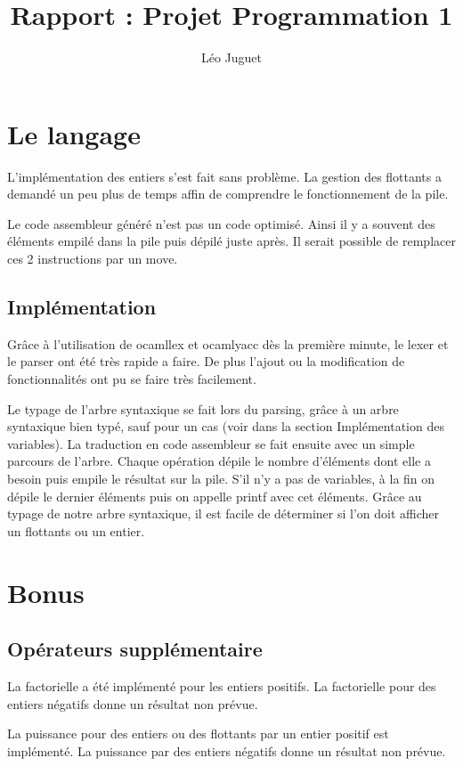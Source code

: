 \documentclass[12pt]{article}
\title{Rapport : Projet Programmation 1}
\author{Léo Juguet}
\date{}
\begin{document}
\maketitle
\newpage

\section{Le langage}
L'implémentation des entiers s'est fait sans problème.
La gestion des flottants a demandé un peu plus de temps
affin de comprendre le fonctionnement de la pile.

Le code assembleur généré n'est pas un code optimisé. Ainsi il 
y a souvent des éléments empilé dans la pile puis dépilé juste après.
Il serait possible de remplacer ces 2 instructions par un move.
\subsection{Implémentation}
Grâce à l'utilisation de ocamllex et ocamlyacc dès la première minute,
le lexer et le parser ont été très rapide a faire. De plus l'ajout
ou la modification de fonctionnalités ont pu se faire très facilement.

Le typage de l'arbre syntaxique se fait lors du parsing, grâce à un 
arbre syntaxique bien typé, sauf pour un cas (voir dans la section Implémentation des variables).
La traduction en code assembleur se fait ensuite avec un simple parcours de l'arbre. Chaque opération
dépile le nombre d'éléments dont elle a besoin puis empile le résultat sur la pile. S'il n'y a pas de variables,
à la fin on dépile le dernier éléments puis on appelle printf avec cet éléments. Grâce au typage de notre arbre syntaxique,
il est facile de déterminer si l'on doit afficher un flottants ou un entier.

\section{Bonus}
\subsection{Opérateurs supplémentaire}

La factorielle a été implémenté pour les entiers positifs. La factorielle pour des entiers négatifs donne un résultat non prévue.

La puissance pour des entiers ou des flottants par un entier positif est implémenté. La puissance par des entiers négatifs donne un résultat non prévue.
\end{document}
